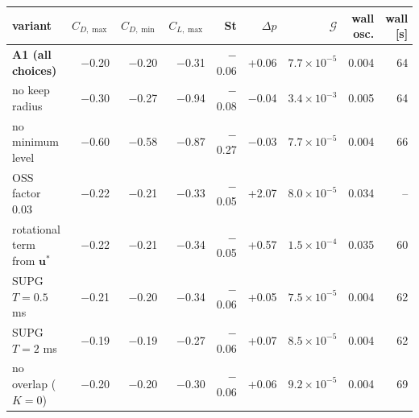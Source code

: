 \begin{tabular}{lrrrrrrrr}
\toprule
variant & $C_{D,\max}$ & $C_{D,\min}$ & $C_{L,\max}$ & St & $\Delta p$ & $\mathcal{G}$ & wall osc. & wall [s] \\
\midrule
\textbf{A1 (all choices)} & $-$0.20 & $-$0.20 & $-$0.31 & $-$0.06 & +0.06 & $7.7\times10^{-5}$ & 0.004 & 64 \\
no keep radius & $-$0.30 & $-$0.27 & $-$0.94 & $-$0.08 & $-$0.04 & $3.4\times10^{-3}$ & 0.005 & 64 \\
no minimum level & $-$0.60 & $-$0.58 & $-$0.87 & $-$0.27 & $-$0.03 & $7.7\times10^{-5}$ & 0.004 & 66 \\
OSS factor 0.03 & $-$0.22 & $-$0.21 & $-$0.33 & $-$0.05 & +2.07 & $8.0\times10^{-5}$ & 0.034 & -- \\
rotational term from $\mathbf{u}^*$ & $-$0.22 & $-$0.21 & $-$0.34 & $-$0.05 & +0.57 & $1.5\times10^{-4}$ & 0.035 & 60 \\
SUPG $T = 0.5$ ms & $-$0.21 & $-$0.20 & $-$0.34 & $-$0.06 & +0.05 & $7.5\times10^{-5}$ & 0.004 & 62 \\
SUPG $T = 2$ ms & $-$0.19 & $-$0.19 & $-$0.27 & $-$0.06 & +0.07 & $8.5\times10^{-5}$ & 0.004 & 62 \\
no overlap ($K = 0$) & $-$0.20 & $-$0.20 & $-$0.30 & $-$0.06 & +0.06 & $9.2\times10^{-5}$ & 0.004 & 69 \\
\bottomrule
\end{tabular}
